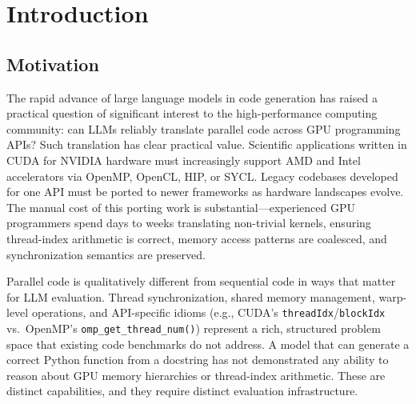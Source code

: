 \documentclass[conference]{IEEEtran}
\begin{document}
\section{Introduction}
\label{sec:introduction}

\subsection{Motivation}
\label{sec:motivation}

The rapid advance of large language models in code generation has raised a practical question of significant interest to the high-performance computing community: can LLMs reliably translate parallel code across GPU programming APIs? Such translation has clear practical value. Scientific applications written in CUDA for NVIDIA hardware must increasingly support AMD and Intel accelerators via OpenMP, OpenCL, HIP, or SYCL. Legacy codebases developed for one API must be ported to newer frameworks as hardware landscapes evolve. The manual cost of this porting work is substantial---experienced GPU programmers spend days to weeks translating non-trivial kernels, ensuring thread-index arithmetic is correct, memory access patterns are coalesced, and synchronization semantics are preserved.


Parallel code is qualitatively different from sequential code in ways that matter for LLM evaluation. Thread synchronization, shared memory management, warp-level operations, and API-specific idioms (e.g., CUDA's \texttt{threadIdx}/\texttt{blockIdx} vs.\ OpenMP's \texttt{omp\_get\_thread\_num()}) represent a rich, structured problem space that existing code benchmarks do not address. A model that can generate a correct Python function from a docstring has not demonstrated any ability to reason about GPU memory hierarchies or thread-index arithmetic. These are distinct capabilities, and they require distinct evaluation infrastructure.
\end{document}

